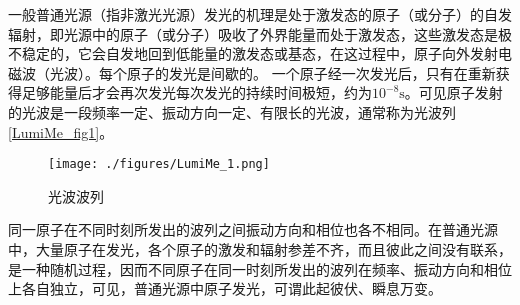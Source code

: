 
一般普通光源（指非激光光源）发光的机理是处于激发态的原子（或分子）的自发辐射，即光源中的原子（或分子）吸收了外界能量而处于激发态，这些激发态是极不稳定的，它会自发地回到低能量的激发态或基态，在这过程中，原子向外发射电磁波（光波）。每个原子的发光是间歇的。 一个原子经一次发光后，只有在重新获得足够能量后才会再次发光每次发光的持续时间极短，约为$10^{-8}\mathrm s$。可见原子发射的光波是一段频率一定、振动方向一定、有限长的光波，通常称为光波列\autoref{LumiMe_fig1}。
\begin{figure}[ht]
\centering
\texttt{[image: ./figures/LumiMe\_1.png]}
\caption{光波波列} \label{LumiMe_fig1}
\end{figure}

同一原子在不同时刻所发出的波列之间振动方向和相位也各不相同。在普通光源中，大量原子在发光，各个原子的激发和辐射参差不齐，而且彼此之间没有联系，是一种随机过程，因而不同原子在同一时刻所发出的波列在频率、振动方向和相位上各自独立，可见，普通光源中原子发光，可谓此起彼伏、瞬息万变。